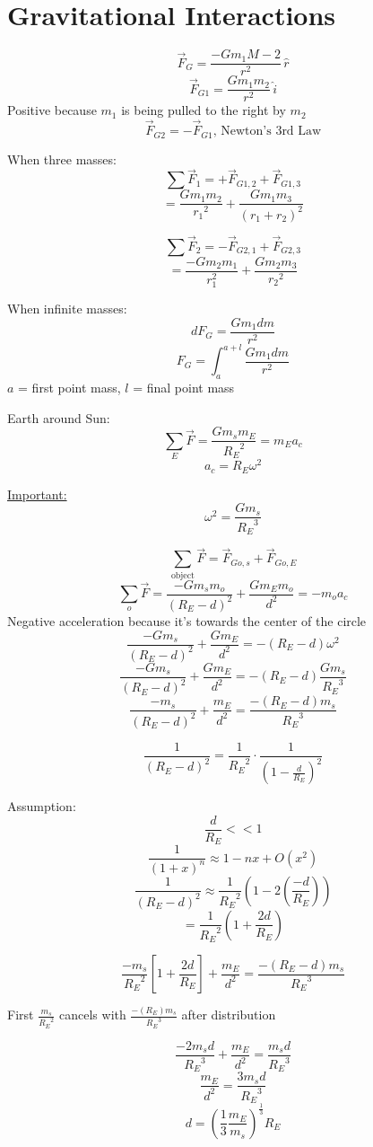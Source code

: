 \documentclass[fleqn]{article}
\begin{document}
\setlength{\mathindent}{0pt}
\section*{Gravitational Interactions}
\[ \vec{F}_{G} = \frac{-Gm_1M-2}{r^2} \, \hat{r}    \]
\[ \vec{F}_{G1} = \frac{Gm_1m_2}{r^2}  \, \hat{i}  \]
Positive because $m_1$ is being pulled to the right by $m_2$
\[ \vec{F}_{G2} = -\vec{F}_{G1}   \text{, Newton's 3rd Law}   \]

When three masses:
\[ \sum \vec{F}_{1} = + \vec{F}_{G1,2} + \vec{F}_{G1,3}       \]
\[ = \frac{Gm_1m_2}{{r_1}^2} + \frac{Gm_1m_3}{(r_1+r_2)^2}  \]

\[ \sum \vec{F}_{2} = -\vec{F}_{G2,1} + \vec{F}_{G2,3}       \]
\[ = \frac{-Gm_2m_1}{r_1^2} + \frac{Gm_2m_3}{{r_2}^2}  \]

When infinite masses:
\[ dF_G = \frac{Gm_1dm}{r^2}  \]
\[ F_G = \int_{a}^{a+l}{\frac{Gm_1dm}{r^2} }\]
$a$ = first point mass, $l$ = final point mass

\bigbreak
Earth around Sun:
\[ \sum _{E} \vec{F} = \frac{Gm_sm_E}{{R_E}^2} = m_Ea_c   \]
\[ a_c=R_E \omega ^2 \]

\underline{Important:}
\[ \omega ^2 = \frac{Gm_s}{{R_E}^3}  \]

\[ \sum _{\text{object} } \vec{F} = \vec{F}_{Go,s} + \vec{F}_{Go,E}     \]
\[ \sum _{o} \vec{F} = \frac{-Gm_sm_o}{(R_E-d)^2} + \frac{Gm_Em_o}{d^2}  = -m_oa_c   \]
Negative acceleration because it's towards the center of the circle
\[ \frac{-Gm_s}{(R_E-d)^2} + \frac{Gm_E}{d^2} = - (R_E-d) \omega ^2 \]
\[ \frac{-Gm_s}{(R_E-d)^2} + \frac{Gm_E}{d^2} = -(R_E-d) \frac{Gm_s}{{R_E}^3}  \]
\[ \frac{-m_s}{(R_E-d)^2} + \frac{m_E}{d^2} = \frac{-(R_E-d)m_s}{{R_E}^3}  \]

\[ \frac{1}{(R_E-d)^2}  = \frac{1}{{R_E}^2} \cdot \frac{1}{(1-\frac{d}{R_E} )^2}  \]

Assumption:
\[ \frac{d}{R_E} << 1 \]
\[ \frac{1}{(1+x)^n} \approx 1-nx + O(x^2)\]
\[ \frac{1}{(R_E-d)^2} \approx \frac{1}{{R_E}^2} (1-2(\frac{- d }{R_E} ))  \]
\[ = \frac{1}{{R_E}^2} (1 + \frac{2d}{R_E} ) \]

\[ \frac{-m_s}{{R_E}^2} \left[ 1 + \frac{2d}{R_E}  \right]
+ \frac{m_E}{d^2} =
\frac{-(R_E-d)m_s}{{R_E}^3} \]

First $\frac{m_s}{{R_E}^2} $ cancels with $\frac{-(R_E)m_s}{{R_E}^3} $ after distribution

\[ \frac{-2m_sd}{{R_E}^3} + \frac{m_E}{d^2} = \frac{m_sd}{{R_E}^3}  \]
\[ \frac{m_E}{d^2} = \frac{3m_sd}{{R_E}^3}  \]
\[ d = \left( \frac{1}{3} \frac{m_E}{m_s}  \right)^{\frac{1}{3} }R_E \]
\end{document}
